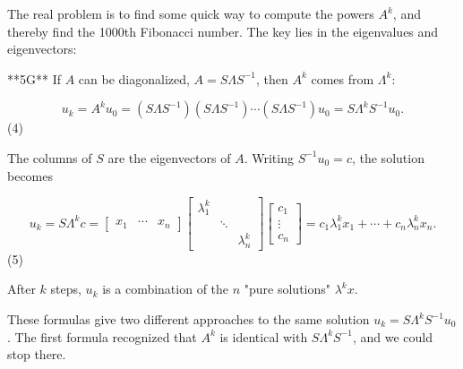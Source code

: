 The real problem is to find some quick way to compute the powers \(A^{k}\), and thereby find the 1000th Fibonacci number. The key lies in the eigenvalues and eigenvectors:

**5G** If \(A\) can be diagonalized, \(A=S\Lambda S^{-1}\), then \(A^{k}\) comes from \(\Lambda^{k}\):

\[u_{k}=A^{k}u_{0}=(S\Lambda S^{-1})(S\Lambda S^{-1})\cdots(S\Lambda S^{-1})u_ {0}=S\Lambda^{k}S^{-1}u_{0}.\] (4)

The columns of \(S\) are the eigenvectors of \(A\). Writing \(S^{-1}u_{0}=c\), the solution becomes

\[u_{k}=S\Lambda^{k}c=\begin{bmatrix}x_{1}&\cdots&x_{n}\end{bmatrix}\begin{bmatrix} \lambda_{1}^{k}&&\\ &\ddots&\\ &&\lambda_{n}^{k}\end{bmatrix}\begin{bmatrix}c_{1}\\ \vdots\\ c_{n}\end{bmatrix}=c_{1}\lambda_{1}^{k}x_{1}+\cdots+c_{n}\lambda_{n}^{k}x_{n}.\] (5)

After \(k\) steps, \(u_{k}\) is a combination of the \(n\) "pure solutions" \(\lambda^{k}x\).

These formulas give two different approaches to the same solution \(u_{k}=S\Lambda^{k}S^{-1}u_{0}\). The first formula recognized that \(A^{k}\) is identical with \(S\Lambda^{k}S^{-1}\), and we could stop there.

 